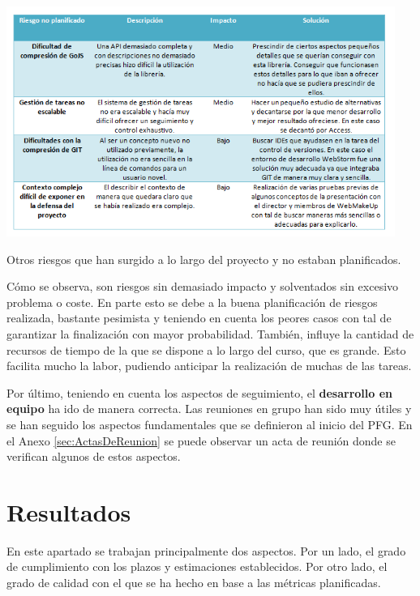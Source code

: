 \begin{table}
\begin{center}
\includegraphics[width=0.95\textwidth]{figs/6-RiesgosNoPlanificados.png}
\end{center}
\caption{Otros riesgos que han surgido a lo largo del proyecto y no estaban planificados.}
\label{tab:RiesgosNoPlanificados}
\end{table}

Cómo se observa, son riesgos sin demasiado impacto y solventados sin excesivo problema o coste. En parte esto se debe a la buena planificación de riesgos realizada, bastante pesimista y teniendo en cuenta los peores casos con tal de garantizar la finalización con mayor probabilidad. También, influye la cantidad de recursos de tiempo de la que se dispone a lo largo del curso, que es grande. Esto facilita mucho la labor, pudiendo anticipar la realización de muchas de las tareas.

Por último, teniendo en cuenta los aspectos de seguimiento, el \textbf{desarrollo en equipo} ha ido de manera correcta. Las reuniones en grupo han sido muy útiles y se han seguido los aspectos fundamentales que se definieron al inicio del PFG. En el Anexo \ref{sec:ActasDeReunion} se puede observar un acta de reunión donde se verifican algunos de estos aspectos.

\section{Resultados}
\label{sec:Resultados}

En este apartado se trabajan principalmente dos aspectos. Por un lado, el grado de cumplimiento con los plazos y estimaciones establecidos. Por otro lado, el grado de calidad con el que se ha hecho en base a las métricas planificadas.

